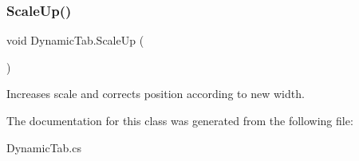 \mbox{\label{class_dynamic_tab_ab215a9f1108a089155cef53d9a529661}} 
\subsubsection{\texorpdfstring{Scale\+Up()}{ScaleUp()}}
{\footnotesize\ttfamily void Dynamic\+Tab.\+Scale\+Up (\begin{DoxyParamCaption}{ }\end{DoxyParamCaption})}



Increases scale and corrects position according to new width. 



The documentation for this class was generated from the following file\+:\begin{DoxyCompactItemize}
\item 
Dynamic\+Tab.\+cs\end{DoxyCompactItemize}
